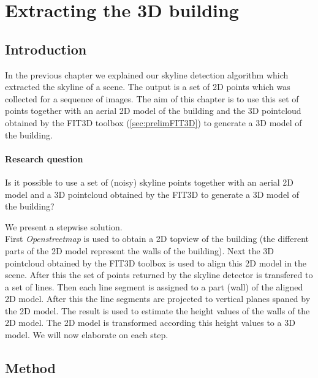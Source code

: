 


\section{Extracting the 3D building}
\label{generate3dModel}
\subsection{Introduction}
In the previous chapter we explained our skyline detection algorithm which
extracted the skyline of a scene. The output is a set of 2D points which was  
collected for a sequence of images.
The aim of this chapter is to use this set of points together with an
 aerial 2D model of the building and the 3D pointcloud obtained by the FIT3D
 toolbox\cite{fit3d} (\ref{sec:prelimFIT3D}) to generate a 3D model of the
 building.


\paragraph{Research question}
Is it possible to use a set of (noisy) skyline points together with an aerial
2D model and a 3D pointcloud obtained by the FIT3D to generate a 3D model of the building?


We present a stepwise solution.\\ 
First \emph{Openstreetmap} is used to obtain a 2D topview of the building (the
different parts of the 2D model represent the walls of the building). Next the
3D pointcloud obtained by the FIT3D toolbox\cite{fit3d} is used to align this 2D
model in the scene.  After this the set of points returned by the skyline
detector is transfered to a set of lines. Then each line segment is assigned to
a part (wall) of the aligned 2D model.  After this the line segments are
projected to vertical planes spaned by the 2D model.  The result is used to
estimate the height values of the walls of the 2D model. The 2D model is
transformed according this height values to a 3D
model.  We will now elaborate on each step.\\


\subsection{Method}
